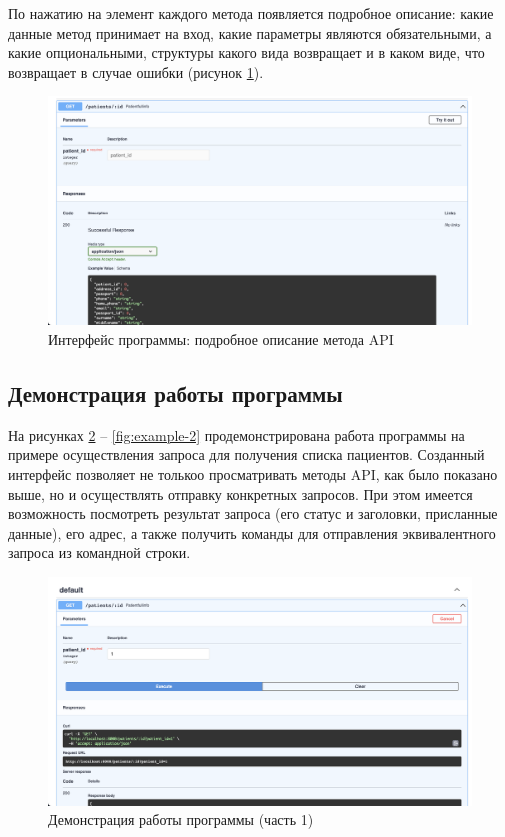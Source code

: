 По нажатию на элемент каждого метода появляется подробное описание: какие данные метод принимает на вход, какие параметры являются обязательными, а какие опциональными, структуры какого вида возвращает и в каком виде, что возвращает в случае ошибки (рисунок \ref{fig:interface-2}).
\begin{figure}[h]
	\centering
	\captionsetup{justification=centering}
	\includegraphics[width=170mm]{img/interface-2.png}
	\caption{Интерфейс программы: подробное описание метода API}
	\label{fig:interface-2}
\end{figure}


\subsection{Демонстрация работы программы}

На рисунках \ref{fig:example-1} -- \ref{fig:example-2} продемонстрирована работа программы на примере осуществления запроса для получения списка пациентов. Созданный интерфейс позволяет не толькоо просматривать методы API, как было показано выше, но и осуществлять отправку конкретных запросов.
При этом имеется возможность посмотреть результат запроса (его статус и заголовки, присланные данные), его адрес, а также получить команды для отправления эквивалентного запроса из командной строки.

\clearpage

\begin{figure}[h]
	\centering
	\captionsetup{justification=centering}
	\includegraphics[width=152mm]{img/example-1.png}
	\caption{Демонстрация  работы  программы  (часть 1)}
	\label{fig:example-1}
\end{figure}


